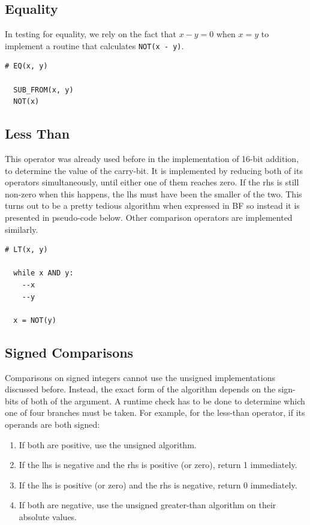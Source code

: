\subsection{Equality}
In testing for equality, we rely on the fact that $x-y=0$ when $x=y$ to implement a routine that calculates \texttt{NOT(x - y)}.

\vspace{0.5cm}\noindent\begin{minipage}{\linewidth}
\begin{lstlisting}[style=brainfuck]
  # EQ(x, y)
  
  SUB_FROM(x, y)
  NOT(x)
\end{lstlisting}
\end{minipage}

\subsection{Less Than}
This operator was already used before in the implementation of 16-bit addition, to determine the value of the carry-bit. It is implemented by reducing both of its operators simultaneously, until either one of them reaches zero. If the rhs is still non-zero when this happens, the lhs must have been the smaller of the two. This turns out to be a pretty tedious algorithm when expressed in BF so instead it is presented in pseudo-code below. Other comparison operators are implemented similarly.

\vspace{0.5cm}\noindent\begin{minipage}{\linewidth}
\begin{lstlisting}[style=pseudocode]
  # LT(x, y)

  while x AND y:
    --x
    --y

  x = NOT(y)
\end{lstlisting}
\end{minipage}

\subsection{Signed Comparisons}
Comparisons on signed integers cannot use the unsigned implementations discussed before. Instead, the exact form of the algorithm depends on the sign-bits of both of the argument. A runtime check has to be done to determine which one of four branches must be taken. For example, for the less-than operator, if its operands are both signed:

\begin{enumerate}
\item If both are positive, use the unsigned algorithm.
\item If the lhs is negative and the rhs is positive (or zero), return 1 immediately.
\item If the lhs is positive (or zero) and the rhs is negative, return 0 immediately.
\item If both are negative, use the unsigned greater-than algorithm on their absolute values.
\end{enumerate}


